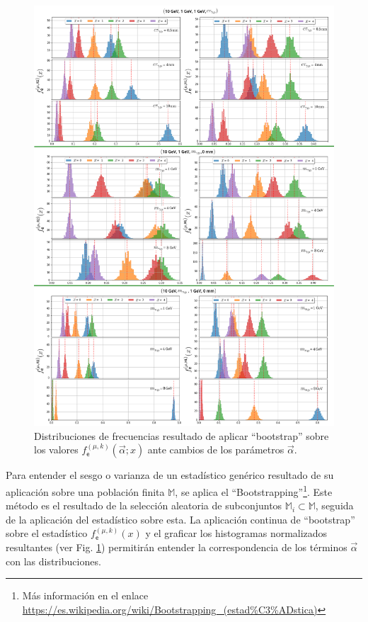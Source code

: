 \begin{figure}[!ht]
\centering
\includegraphics[width=.9\textwidth]{Simulacion/imagenes/Distribucion_Entries.png}
\caption{Distribuciones de frecuencias resultado de aplicar ``bootstrap'' sobre los valores $f^{(\mu, k)}_\textsf{e} (\vec{\alpha}; x)$ ante cambios de los parámetros $\vec{\alpha}$.}
\label{entradas}
\end{figure}

Para entender el sesgo o varianza de un estadístico genérico resultado de su aplicación sobre una población finita $\mathbb{M}$, se aplica el ``Bootstrapping''\footnote{Más información en el enlace \href{https://es.wikipedia.org/wiki/Bootstrapping\_(estad\%C3\%ADstica)}{https://\-es.\-wi\-ki\-pe\-dia.\-org/\-wi\-ki/\-Boots\-tra\-pping\_(es\-tad\-\%C3\-\%AD\-sti\-ca)}}. Este método es el resultado de la selección aleatoria de subconjuntos $\mathbb{M}_i\subset \mathbb{M}$, seguida de la aplicación del estadístico sobre esta. La aplicación continua de ``bootstrap'' sobre el estadístico $f^{(\mu, k)}_\textsf{e} (x)$ y el graficar los histogramas normalizados resultantes (ver Fig. \ref{entradas}) permitirán entender la correspondencia de los términos $\vec{\alpha}$ con las distribuciones.

